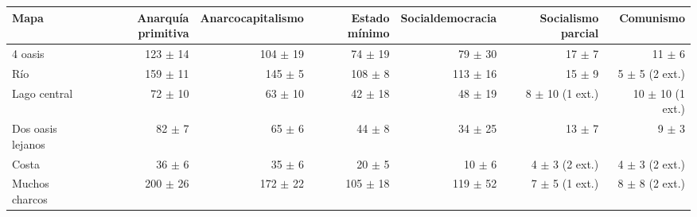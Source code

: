 \begin{tabular}{lrrrrrr}
\toprule
Mapa & Anarquía primitiva & Anarcocapitalismo & Estado mínimo & Socialdemocracia & Socialismo parcial & Comunismo \\
\midrule
4 oasis & 123 $\pm$ 14 & 104 $\pm$ 19 & 74 $\pm$ 19 & 79 $\pm$ 30 & 17 $\pm$ 7 & 11 $\pm$ 6 \\
Río & 159 $\pm$ 11 & 145 $\pm$ 5 & 108 $\pm$ 8 & 113 $\pm$ 16 & 15 $\pm$ 9 & 5 $\pm$ 5 (2 ext.) \\
Lago central & 72 $\pm$ 10 & 63 $\pm$ 10 & 42 $\pm$ 18 & 48 $\pm$ 19 & 8 $\pm$ 10 (1 ext.) & 10 $\pm$ 10 (1 ext.) \\
Dos oasis lejanos & 82 $\pm$ 7 & 65 $\pm$ 6 & 44 $\pm$ 8 & 34 $\pm$ 25 & 13 $\pm$ 7 & 9 $\pm$ 3 \\
Costa & 36 $\pm$ 6 & 35 $\pm$ 6 & 20 $\pm$ 5 & 10 $\pm$ 6 & 4 $\pm$ 3 (2 ext.) & 4 $\pm$ 3 (2 ext.) \\
Muchos charcos & 200 $\pm$ 26 & 172 $\pm$ 22 & 105 $\pm$ 18 & 119 $\pm$ 52 & 7 $\pm$ 5 (1 ext.) & 8 $\pm$ 8 (2 ext.) \\
\bottomrule
\end{tabular}
